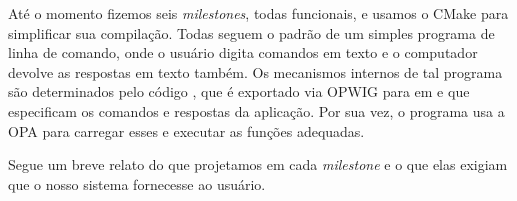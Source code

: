 
Até o momento fizemos seis \textit{milestones}, todas funcionais, e usamos o CMake 
para simplificar sua compilação. Todas seguem o padrão de um simples programa de 
linha de comando, onde o usuário digita comandos em texto e o computador devolve
as respostas em texto também. Os mecanismos internos de tal programa são determinados
pelo código \CXX{}, que é exportado via OPWIG para  em  e
 que especificam os comandos e respostas da aplicação. Por sua vez, o
programa usa a OPA para carregar esses  e executar as funções adequadas.

Segue um breve relato do que projetamos em cada \textit{milestone} e o que elas
exigiam que o nosso sistema fornecesse ao usuário.


